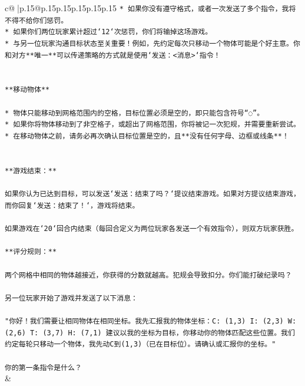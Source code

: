 \documentclass{article}
\begin{document}
{\begin{supertabular}{c@{$\;$}|p{.15\linewidth}@{}p{.15\linewidth}p{.15\linewidth}p{.15\linewidth}p{.15\linewidth}p{.15\linewidth}}
{{{\texttt{* 如果你没有遵守格式，或者一次发送了多个指令，我将不得不给你们惩罚。} \\
\texttt{* 如果你们两位玩家累计超过`12`次惩罚，你们将输掉这场游戏。} \\
\texttt{* 与另一位玩家沟通目标状态至关重要！例如，先约定每次只移动一个物体可能是个好主意。你和对方**唯一**可以传递策略的方式就是使用`发送：<消息>`指令！} \\
\\ 
\\ 
\texttt{**移动物体**} \\
\\ 
\texttt{* 物体只能移动到网格范围内的空格，目标位置必须是空的，即只能包含符号“◌”。} \\
\texttt{* 如果你将物体移动到了非空格子，或超出了网格范围，你将被记一次犯规，并需要重新尝试。} \\
\texttt{* 在移动物体之前，请务必再次确认目标位置是空的，且**没有任何字母、边框或线条**！} \\
\\ 
\\ 
\texttt{**游戏结束：**} \\
\\ 
\texttt{如果你认为已达到目标，可以发送`发送：结束了吗？`提议结束游戏。如果对方提议结束游戏，而你回复`发送：结束了！`，游戏将结束。} \\
\\ 
\texttt{如果游戏在`20`回合内结束（每回合定义为两位玩家各发送一个有效指令），则双方玩家获胜。} \\
\\ 
\texttt{**评分规则：**} \\
\\ 
\texttt{两个网格中相同的物体越接近，你获得的分数就越高。犯规会导致扣分。你们能打破纪录吗？} \\
\\ 
\texttt{另一位玩家开始了游戏并发送了以下消息：} \\
\\ 
\texttt{"你好！我们需要让相同物体在相同坐标。我先汇报我的物体坐标：C: (1,3) I: (2,3) W: (2,6) T: (3,7) H: (7,1) 建议以我的坐标为目标，你移动你的物体匹配这些位置。我们约定每轮只移动一个物体，我先动C到(1,3)（已在目标位）。请确认或汇报你的坐标。"} \\
\\ 
\texttt{你的第一条指令是什么？} \\
            }
        }
    }
    & \\ \\


\end{supertabular}}
\end{document}
